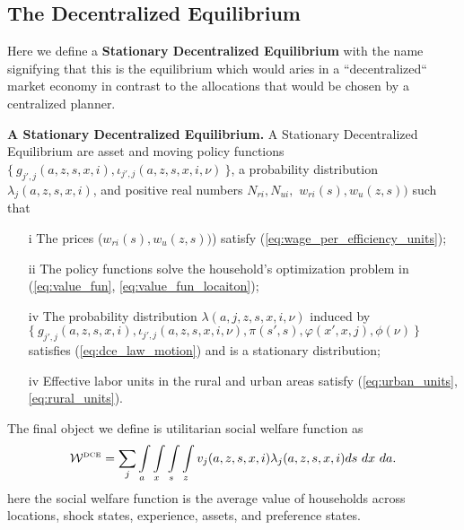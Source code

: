 \documentclass[12pt,pdftex]{article}
\begin{document}
\begin{onehalfspacing}
\subsection{The Decentralized Equilibrium}

Here we define a \textbf{Stationary Decentralized Equilibrium} with the name signifying that this is the equilibrium which would aries in a ``decentralized`` market economy in contrast to the allocations that would be chosen by a centralized planner.

\textbf{A Stationary Decentralized Equilibrium.} A Stationary Decentralized Equilibrium are asset and moving policy functions $\{\ g_{j',j}(a, z, s, x, i), \iota_{j',j}(a, z, s, x, i, \nu) \ \}$, a probability distribution $\lambda_{j}(a, z, s, x, i)$, and positive real numbers $N_{ri}, N_{ui},$ $w_{ri}(s), w_{u}(z, s))$ such that
\begin{itemize}
\vspace{-.4cm}
\item[i] The prices ($w_{ri}(s), w_{u}(z, s))$) satisfy (\ref{eq:wage_per_efficiency_units});
\item[ii] The policy functions solve the household's optimization problem in (\ref{eq:value_fun}, \ref{eq:value_fun_locaiton});
\item[iv] The probability distribution $\lambda(a, j, z, s, x, i, \nu)$ induced by \\
$\{\ g_{j',j}(a, z, s, x, i), \iota_{j',j}(a, z, s, x, i, \nu), \pi(s',s), \varphi(x',x,j), \phi(\nu) \ \}$ satisfies (\ref{eq:dce_law_motion}) and is a stationary distribution;
\item[iv] Effective labor units in the rural and urban areas satisfy (\ref{eq:urban_units}, \ref{eq:rural_units}).
\end{itemize}

The final object we define is utilitarian social welfare function as
\begin{align}
\mathcal{W}^{\mbox{\tiny DCE}} = \sum_{j} \int\limits_{a} \int\limits_{x} \int\limits_{s}  \int\limits_{z}  v_j(a, z, s, x, i)  \lambda_j(a, z, s, x, i) ds \ dx \ da.
\label{eq:D-social_welfare}
\end{align}
here the social welfare function is the average value of households across locations, shock states, experience, assets, and preference states.


\end{onehalfspacing}
\end{document}
